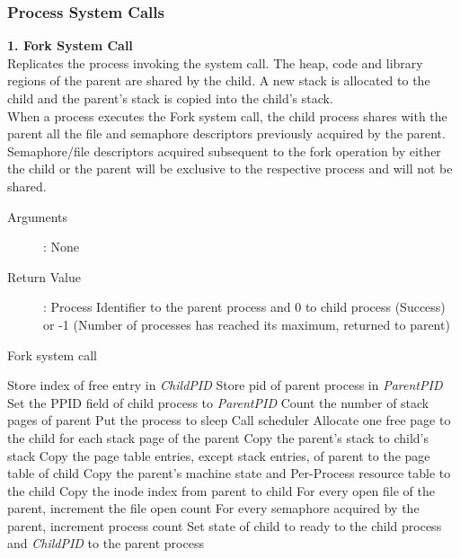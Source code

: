 \documentclass[11pt ,twosided]{article}
\begin{document}
\subsubsection{Process System Calls}
\textbf{1. Fork System Call}
\\
Replicates the process invoking the system call. The heap, code and library regions of the parent are shared by the child. A new stack is allocated to the child and the parent's stack is copied into the child's stack.
\\
When a process executes the Fork system call, the child process shares with the parent all the file and semaphore descriptors previously acquired by the parent. Semaphore/file descriptors acquired subsequent to the fork operation by either the child or the parent will be exclusive to the respective process and will not be shared.
\begin{description}
\item[Arguments]: None
\item[Return Value]: Process Identifier to the parent process and 0 to child process (Success) or -1 (Number of processes has reached its maximum, returned to parent)
\end{description} 
\iffalse
\begin{algorithm}
\caption{Fork system call}
\begin{algorithmic}
\ELSE
    \STATE Store index of free entry in \textit{ChildPID}
    \STATE Store pid of parent process in \textit{ParentPID}
\ENDIF
\STATE Set the PPID field of child process to \textit{ParentPID}
\STATE Count the number of stack pages of parent
    \STATE Put the process to sleep
    \STATE Call scheduler
\ENDWHILE
\STATE Allocate one free page to the child for each stack page of the parent
\STATE Copy the parent's stack to child's stack
\STATE Copy the page table entries, except stack entries, of parent to the page table of child
\STATE Copy the parent's machine state and Per-Process resource table to the child
\STATE Copy the inode index from parent to child 
\STATE For every open file of the parent, increment the file open count
\STATE For every semaphore acquired by the parent, increment process count
\STATE Set state of child to ready
 to the child process and \textit{ChildPID} to the parent process
\end{algorithmic}
\end{algorithm}
\vspace{22mm}
\end{document}
